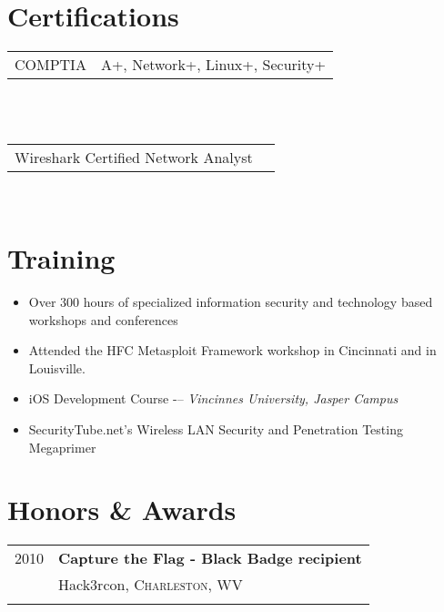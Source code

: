 \documentclass[10pt]{article} %
\begin{document}
{\begin{minipage}[t]{0.44\textwidth}
\section {Certifications}
\begin{tabular}{rl}
COMPTIA &  A+, Network+, Linux+, Security+ 
\end{tabular}\\[-5pt]
\\
\begin{tabular}{rl}
Wireshark Certified Network Analyst
\end{tabular}\\[-5pt]

\section{Training}
\begin{itemize}
\item Over 300 hours of specialized information security and technology based workshops and conferences
\item Attended the HFC Metasploit Framework workshop in Cincinnati and in Louisville.
\item iOS Development Course -– \textit{Vincinnes University, Jasper Campus}
\item SecurityTube.net's Wireless LAN Security and Penetration Testing Megaprimer
\end{itemize}


\section{Honors \& Awards} 

\begin{tabular}{rl}
2010	 & \textbf{Capture the Flag - Black Badge recipient}\\
& Hack3rcon, \textsc{Charleston, WV}\\ \\



\end{tabular}
\end{minipage}}
\end{document}

